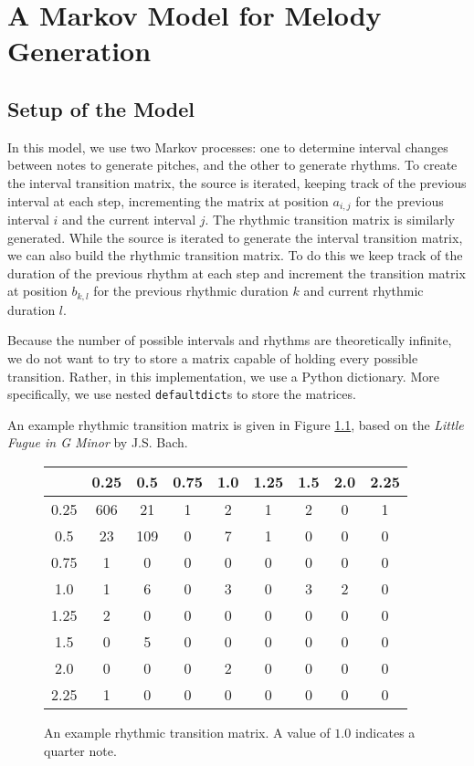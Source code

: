 \chapter{A Markov Model for Melody Generation} \label{markov}

\section{Setup of the Model} \label{markov:setup}

In this model, we use two Markov processes: one to determine interval changes between notes to generate pitches, and the other to generate rhythms.
To create the interval transition matrix, the source is iterated, keeping track of the previous interval at each step, incrementing the matrix at position $a_{i,j}$ for the previous interval $i$ and the current interval $j$.
The rhythmic transition matrix is similarly generated.
While the source is iterated to generate the interval transition matrix, we can also build the rhythmic transition matrix.
To do this we keep track of the duration of the previous rhythm at each step and increment the transition matrix at position $b_{k,l}$ for the previous rhythmic duration $k$ and current rhythmic duration $l$.

Because the number of possible intervals and rhythms are theoretically infinite, we do not want to try to store a matrix capable of holding every possible transition.
Rather, in this implementation, we use a Python dictionary.
More specifically, we use nested \texttt{defaultdict}s to store the matrices.

An example rhythmic transition matrix is given in Figure \ref{fig:rhythmTransitionMatrix}, based on the \textit{Little Fugue in G Minor} by J.S. Bach.

\begin{figure}
	\centering
	\begin{tabular}{c | c c c c c c c c}
		& 0.25 & 0.5 & 0.75 & 1.0 & 1.25 & 1.5 & 2.0 & 2.25\\
		\hline
		0.25 & 606 & 21 & 1 & 2 & 1 & 2 & 0 & 1\\
		0.5 & 23 & 109 & 0 & 7 & 1 & 0 & 0 & 0\\
		0.75 & 1 & 0 & 0 & 0 & 0 & 0 & 0 & 0\\
		1.0 & 1 & 6 & 0 & 3 & 0 & 3 & 2 & 0\\
		1.25 & 2 & 0 & 0 & 0 & 0 & 0 & 0 & 0\\
		1.5 & 0 & 5 & 0 & 0 & 0 & 0 & 0 & 0\\
		2.0 & 0 & 0 & 0 & 2 & 0 & 0 & 0 & 0\\
		2.25 & 1 & 0 & 0 & 0 & 0 & 0 & 0 & 0
	\end{tabular}
	\caption{An example rhythmic transition matrix. A value of $1.0$ indicates a quarter note.}
	\label{fig:rhythmTransitionMatrix}
\end{figure}

